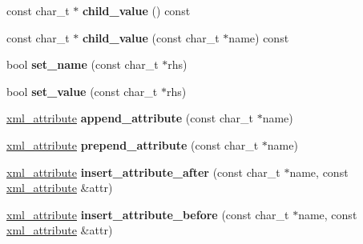 \begin{DoxyCompactItemize}
\item 
\hypertarget{classpugi_1_1xml__node_a1c824a58d4c591c0da8f5dc39938456f}{}const char\+\_\+t $\ast$ {\bfseries child\+\_\+value} () const \label{classpugi_1_1xml__node_a1c824a58d4c591c0da8f5dc39938456f}

\item 
\hypertarget{classpugi_1_1xml__node_ad091dcc0ff970fb2920b8b2942154c94}{}const char\+\_\+t $\ast$ {\bfseries child\+\_\+value} (const char\+\_\+t $\ast$name) const \label{classpugi_1_1xml__node_ad091dcc0ff970fb2920b8b2942154c94}

\item 
\hypertarget{classpugi_1_1xml__node_a9d688489fcf0960e945a12480419e434}{}bool {\bfseries set\+\_\+name} (const char\+\_\+t $\ast$rhs)\label{classpugi_1_1xml__node_a9d688489fcf0960e945a12480419e434}

\item 
\hypertarget{classpugi_1_1xml__node_a160f1fa7a0eda1e5ad9d19d45f6b0e4e}{}bool {\bfseries set\+\_\+value} (const char\+\_\+t $\ast$rhs)\label{classpugi_1_1xml__node_a160f1fa7a0eda1e5ad9d19d45f6b0e4e}

\item 
\hypertarget{classpugi_1_1xml__node_a417eb03f034b432bb2800e54e38022aa}{}\hyperlink{classpugi_1_1xml__attribute}{xml\+\_\+attribute} {\bfseries append\+\_\+attribute} (const char\+\_\+t $\ast$name)\label{classpugi_1_1xml__node_a417eb03f034b432bb2800e54e38022aa}

\item 
\hypertarget{classpugi_1_1xml__node_a7d70631d6cb3624cdfc4cf9ef4abad06}{}\hyperlink{classpugi_1_1xml__attribute}{xml\+\_\+attribute} {\bfseries prepend\+\_\+attribute} (const char\+\_\+t $\ast$name)\label{classpugi_1_1xml__node_a7d70631d6cb3624cdfc4cf9ef4abad06}

\item 
\hypertarget{classpugi_1_1xml__node_a74ab20fa84dffde317f8899af628f041}{}\hyperlink{classpugi_1_1xml__attribute}{xml\+\_\+attribute} {\bfseries insert\+\_\+attribute\+\_\+after} (const char\+\_\+t $\ast$name, const \hyperlink{classpugi_1_1xml__attribute}{xml\+\_\+attribute} \&attr)\label{classpugi_1_1xml__node_a74ab20fa84dffde317f8899af628f041}

\item 
\hypertarget{classpugi_1_1xml__node_a742898bc2342d943a4c49916ac3a64b8}{}\hyperlink{classpugi_1_1xml__attribute}{xml\+\_\+attribute} {\bfseries insert\+\_\+attribute\+\_\+before} (const char\+\_\+t $\ast$name, const \hyperlink{classpugi_1_1xml__attribute}{xml\+\_\+attribute} \&attr)\label{classpugi_1_1xml__node_a742898bc2342d943a4c49916ac3a64b8}


\end{DoxyCompactItemize}
